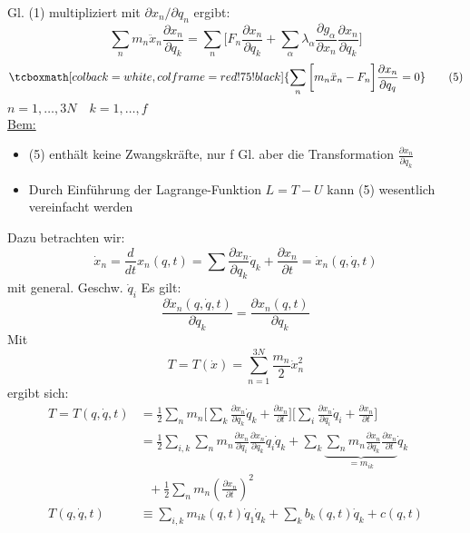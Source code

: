 \documentclass[titlepage,12pt,a4paper,ngerman]{report}
\newcommand{\ub}[1]{\underbrace{#1}}
\newcommand{\rmbox}[1]{\tcboxmath[colback=white,colframe=red!75!black]{#1}} %
\renewcommand{\boxed}{\rmbox}
\begin{document}
Gl. (1) multipliziert mit $ \partial x_n / \partial q_n $ ergibt:
$$\sum_{n} m_n \ddot{x}_n \frac{\partial x_n}{\partial q_k} = \sum_n \bigg[ F_n \frac{\partial x_n}{\partial q_k} + \sum_\alpha \lambda_\alpha \frac{\partial g_\alpha}{\partial x_n } \frac{\partial x_n}{\partial q_k} \bigg]$$
\begin{equation*}
\boxed{\sum_n \bigg[ m _n \ddot{x}_n - F_n \bigg] \frac{\partial x_n}{\partial q_q} = 0 } \tag{5}
\end{equation*}
$ n = 1,  \dots , 3N \quad k = 1, \dots , f$\\
\underline{Bem:}
\begin{itemize}
	\item (5) enthält keine Zwangskräfte, nur f Gl. aber die Transformation $ \frac{\partial x_n}{\partial q_k} $
	\item Durch Einführung der Lagrange-Funktion $ L = T-U $ kann (5) wesentlich vereinfacht werden
\end{itemize} 
Dazu betrachten wir:\\
\begin{equation*}
\dot{x}_n = \frac{d}{dt} x_n (q,t) = \sum \frac{\partial x_n}{\partial q_k} \dot{q}_k + \frac{\partial x_n}{\partial t} = \dot{x}_n (q,\dot{q},t) \tag{6}
\end{equation*}
mit general. Geschw. $ \dot{q}_i $ Es gilt:
\begin{equation*}
\frac{\partial \dot{x}_n (q,\dot{q},t)}{\partial \dot{q}_k} = \frac{\partial x_n (q,t)}{\partial q_k} \tag{7}
\end{equation*}
Mit 
\begin{equation*}
T = T(\dot{x}) = \sum_{n=1}^{3N} \frac{m_n}{2} \dot{x}_n^2 \tag{8}
\end{equation*}
ergibt sich: 
\begin{align*}
T = T(q,\dot{q},t) &= \frac{1}{2} \sum_n m_n \bigg[ \sum_k \frac{\partial x_n}{\partial q_k} \dot{q}_k + \frac{\partial
	x_n}{\partial t} \bigg] \bigg[ \sum_i \frac{\partial x_n}{\partial q_i} \dot{q}_i + \frac{\partial x_n}{\partial t}\bigg]\\
&= \frac{1}{2} \sum_{i,k} \sum_n m_n \frac{\partial x_n }{\partial q_i} \frac{\partial x_n}{\partial q_k} \dot{q}_i \dot{q}_k + \sum_k \ub{\sum_n m_n \frac{\partial x_n}{\partial q_k} \frac{\partial x_n}{\partial t}}_{= m_{ik}} \dot{q}_k \\
& \ \ \ + \frac{1}{2} \sum_n m_n \left(\frac{\partial x_n}{\partial t}\right)^2\\
T(q,\dot{q},t) & \equiv \sum_{i,k} m_{ik} (q,t) \dot{q}_1 \dot{q}_k + \sum_k  b_k (q,t) \dot{q}_k + c(q,t) \tag{9}
\end{align*}
\end{document}
